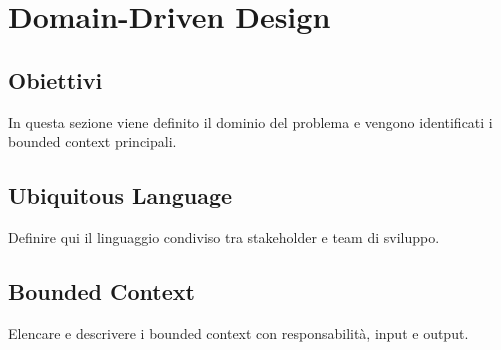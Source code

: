 \chapter{Domain-Driven Design}

\section{Obiettivi}
In questa sezione viene definito il dominio del problema e vengono identificati i bounded context principali.

\section{Ubiquitous Language}
Definire qui il linguaggio condiviso tra stakeholder e team di sviluppo.

\section{Bounded Context}
Elencare e descrivere i bounded context con responsabilità, input e output.
